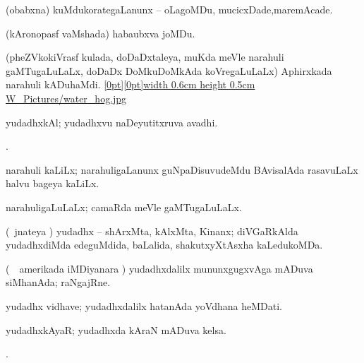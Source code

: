 {\noindent 
\gl{\pagu}
\expl{}
\bmng
{} (obabxna) kuMdukorategaLanunx -- oLagoMDu, mucicxDade,maremAcade. 
\emng
\eentry

\bentry
{} 
\gl{\nA}
\expl{}
\bmng
(kAronopasf vaMshada) habaubxva joMDu. 
\emng
\eentry

\bentry
{} 
\gl{\nA}
\expl{}
\bmng
{} 
\emng
\eentry

 \bentry
{} 
\gl{\nA}
\expl{}
\bmng
(pheZVkokiVrasf kulada, doDaDxtaleya, muKda meVle narahuli gaMTugaLuLaLx, doDaDx DoMkuDoMkAda koVregaLuLaLx) Aphirxkada narahuli kADuhaMdi. \quad \hyperlink{water_hogfigure}{\raisebox{-0.20cm}[0pt][0pt]{\pdfimage width 0.6cm height 0.5cm {W_Pictures/water_hog.jpg}}} 
\emng
\eentry

 \bentry
{} 
\gl{\nA}
\expl{}
\bmng
yudadhxkAl; yudadhxvu naDeyutitxruva avadhi. 
\emng
\eentry

\bentry
{} 
\gl{\nA}
\expl{}
\bmng
{}. 
\emng
\eentry

\bentry
{} 
\gl{\nA}
\expl{}
\bmng
narahuli kaLiLx; narahuligaLanunx guNpaDisuvudeMdu BAvisalAda rasavuLaLx halvu bageya kaLiLx. 
\emng
\eentry

\bentry
{} 
\gl{\gu}
\expl{}
\bmng
narahuligaLuLaLx; camaRda meVle gaMTugaLuLaLx. 
\emng
\eentry

\bentry
{} 
\gl{\gu}
\expl{}
\bmng
(\kanmu\ jnateya \vi) yudadhx -- shArxMta, kAlxMta, Kinanx; diVGaRkAlda yudadhxdiMda edeguMdida, baLalida, shakutxyXtAsxha kaLedukoMDa. 
\emng
\eentry

\bentry
{} 
\gl{\nA}
\expl{}
\bmng
(\kanmu\ \kanu\ amerikada iMDiyanara \vi) yudadhxdalilx mununxgugxvAga mADuva siMhanAda; raNgajRne. 
\emng
\eentry

\bentry
{} 
\gl{\nA}
\expl{}
\bmng
yudadhx vidhave; yudadhxdalilx hatanAda yoVdhana heMDati. 
\emng
\eentry

\bentry
{} 
\gl{\nA}
\expl{}
\bmng
yudadhxkAyaR; yudadhxda kAraN mADuva kelsa. 
\emng
\eentry

\bentry
{} 
\gl{\gu}
\expl{}
\bmng
{}. 
\emng
\eentry

}
